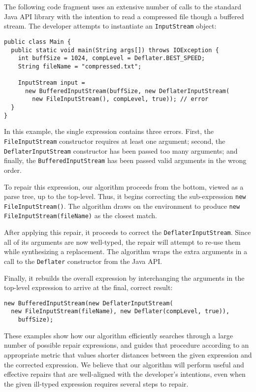 The following code fragment uses an extensive number of calls to the standard Java API library with the intention to read a compressed file though a buffered stream. The developer attempts to instantiate an \lstinline{InputStream} object:
\begin{lstlisting}
public class Main {
  public static void main(String args[]) throws IOException {
    int buffSize = 1024, compLevel = Deflater.BEST_SPEED;
    String fileName = "compressed.txt";
    
    InputStream input = 
      new BufferedInputStream(buffSize, new DeflaterInputStream(
        new FileInputStream(), compLevel, true)); // error 
  }
}
\end{lstlisting}
In this example, the single expression contains three errors. First, the \lstinline{FileInputStream} constructor requires at least one argument; second, the \lstinline{DeflaterInputStream} constructor has been passed too many arguments; and finally, the \lstinline{BufferedInputStream} has been passed valid arguments in the wrong order.

To repair this expression, our algorithm proceeds from the bottom, viewed as a parse tree, up to the top-level. Thus, it begins correcting the sub-expression \lstinline{new FileInputStream()}. The algorithm draws on the environment to produce \lstinline{new FileInputStream(fileName)} as the closest match.

After applying this repair, it proceeds to correct the \lstinline{DeflaterInputStream}. Since all of its arguments are now well-typed, the repair will attempt to re-use them while synthesizing a replacement. The algorithm wraps the extra arguments in a call to the \lstinline{Deflater} constructor from the Java API.

Finally, it rebuilds the overall expression by interchanging the arguments in the top-level expression to arrive at the final, correct result:
\begin{lstlisting}   
new BufferedInputStream(new DeflaterInputStream(
  new FileInputStream(fileName), new Deflater(compLevel, true)),
    buffSize);
\end{lstlisting}

These examples show how our algorithm efficiently searches through a large number of possible repair expressions, and guides that procedure according to an appropriate metric that values shorter distances between the given expression and the corrected expression. We believe that our algorithm will perform useful and effective repairs that are well-aligned with the developer's intentions, even when the given ill-typed expression requires several steps to repair.
